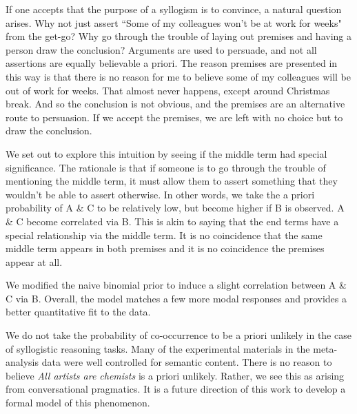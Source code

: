 \documentclass[10pt,letterpaper]{article}
\begin{document}
If one accepts that the purpose of a syllogism is to convince, a natural question arises. Why not just assert ``Some of my colleagues won't be at work for weeks" from the get-go? Why go through the trouble of laying out premises and having a person draw the conclusion? Arguments are used to persuade, and not all assertions are equally believable a priori. The reason premises are presented in this way is that there is no reason for me to believe some of my colleagues will be out of work for weeks. That almost never happens, except around Christmas break. And so the conclusion is not obvious, and the premises are an alternative route to persuasion. If we accept the premises, we are left with no choice but to draw the conclusion.

We set out to explore this intuition by seeing if the middle term had special significance. The rationale is that if someone is to go through the trouble of mentioning the middle term, it must allow them to assert something that they wouldn't be able to assert otherwise. In other words, we take the a priori probability of A \& C to be relatively low, but become higher if B is observed. A \& C become correlated via B. This is akin to saying that the end terms have a special relationship via the middle term. It is no coincidence that the same middle term appears in both premises and it is no coincidence the premises appear at all. 

We modified the naive binomial prior to induce a slight correlation between A \& C via B. Overall, the model matches a few more modal responses and provides a better quantitative fit to the data. 

We do not take the probability of co-occurrence to be a priori unlikely in the case of syllogistic reasoning tasks. Many of the experimental materials in the meta-analysis data were well controlled for semantic content. There is no reason to believe \emph{All artists are chemists} is a priori unlikely. Rather, we see this as arising from conversational pragmatics. It is a future direction of this work to develop a formal model of this phenomenon.

\end{document}
